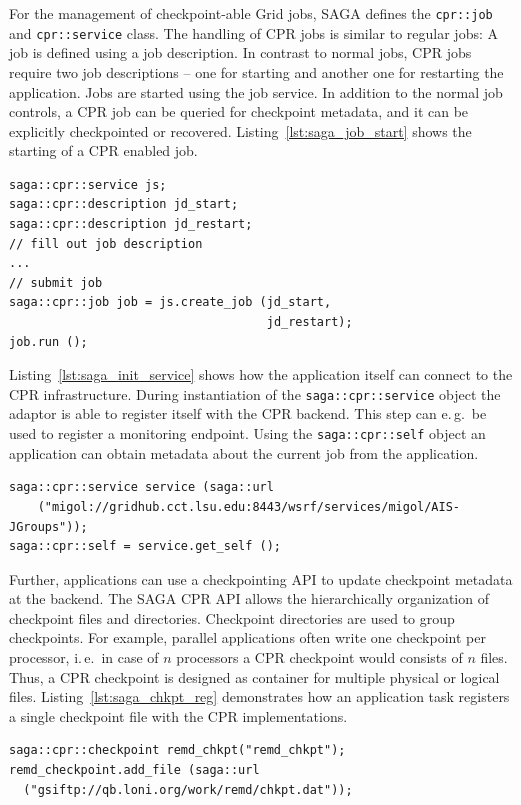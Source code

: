 \documentclass[times, 10pt, twocolumn]{article}
\begin{document}
For the management of checkpoint-able Grid jobs, SAGA defines the \texttt{cpr::job} and \texttt{cpr::service} class. The handling of 
CPR jobs is similar to regular jobs: A job is defined using a job description. In contrast to normal jobs, 
CPR jobs require  two job descriptions -- one for starting and another one for restarting the application.
Jobs are started using the job service. In addition to the normal job controls, a CPR job can be queried for checkpoint metadata, and 
it can be explicitly checkpointed or recovered. Listing~\ref{lst:saga_job_start} shows the starting of a CPR enabled job.

\begin{lstlisting}[style=myListing, caption={SAGA CPR: Starting a Job}, float=t, label={lst:saga_job_start}]
saga::cpr::service js; 
saga::cpr::description jd_start;
saga::cpr::description jd_restart;
// fill out job description
...
// submit job  
saga::cpr::job job = js.create_job (jd_start, 
                                    jd_restart);
job.run ();
\end{lstlisting}

Listing~\ref{lst:saga_init_service} shows how the application itself can connect to the CPR infrastructure. During instantiation of the \texttt{saga::cpr::service} object the adaptor is able to register itself with the CPR backend. This step can e.\,g.\ be used to register a monitoring endpoint. Using the \texttt{saga::cpr::self} object an application can obtain metadata about the current job from the application.                                                                               
\begin{lstlisting}[style=myListing, caption={SAGA CPR: Initialize Migol Session}, float=t, label={lst:saga_init_service}]
saga::cpr::service service (saga::url 
    ("migol://gridhub.cct.lsu.edu:8443/wsrf/services/migol/AIS-JGroups"));
saga::cpr::self = service.get_self ();
\end{lstlisting}

Further, applications can use a checkpointing API to update checkpoint metadata at the backend. The SAGA CPR API allows the hierarchically 
organization of checkpoint files and directories. Checkpoint directories are 
used to group checkpoints. For example, parallel applications often write one checkpoint per 
processor, i.\,e.\ in case of $n$ processors a CPR checkpoint
would consists of $n$ files. Thus, a CPR checkpoint is designed as container 
for multiple physical or logical files. Listing~\ref{lst:saga_chkpt_reg} demonstrates 
how an application task registers a single checkpoint file with the CPR implementations.     
\begin{lstlisting}[style=myListing, caption={SAGA CPR: Register Checkpoint with Migol}, float=t, label={lst:saga_chkpt_reg}]
saga::cpr::checkpoint remd_chkpt("remd_chkpt");
remd_checkpoint.add_file (saga::url 
  ("gsiftp://qb.loni.org/work/remd/chkpt.dat"));
\end{lstlisting}
\end{document}
